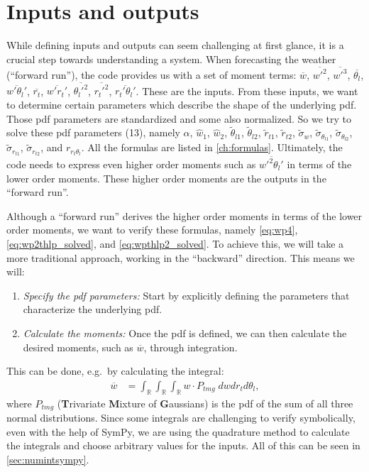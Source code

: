 \section{Inputs and outputs}\label{sec:inputsandoutputs}

While defining inputs and outputs can seem challenging at first glance,
it is a crucial step towards understanding a system.
When forecasting the weather (\enquote{forward run}),
the code provides us with a set of moment terms:
$\overline{w}$, $\overline{w'^2}$, $\overline{w'^3}$, $\overline{\theta_l}$, $\overline{w'\theta_l'}$,
$\overline{r_t}$, $\overline{w' r_t'}$, $\overline{\theta_l'^2}$, $\overline{r_t'^2}$, $\overline{r_t'\theta_l'}$.
These are the inputs.
From these inputs,
we want to determine certain parameters which describe the shape of the underlying \gls{pdf}.
Those \gls{pdf} parameters are standardized and some also normalized.
So we try to solve these \gls{pdf} parameters (13),
namely $\alpha$, $\widehat{w}_1$, $\widehat{w}_2$, $\tilde{\theta}_{l1}$, $\tilde{\theta}_{l2}$, $\tilde{r}_{t1}$,
$\tilde{r}_{t2}$, $\tilde{\sigma}_w$, $\tilde{\sigma}_{\theta_{l1}}$, $\tilde{\sigma}_{\theta_{l2}}$,
$\tilde{\sigma}_{r_{t1}}$, $\tilde{\sigma}_{r_{t2}}$, and $r_{r_t \theta_l}$.
All the formulas are listed in \cref{ch:formulas}.
Ultimately, the code needs to express even higher order moments such as $\overline{w'^2 \theta_l'}$
in terms of the lower order moments.
These higher order moments are the outputs in the \enquote{forward run}.

Although a \enquote{forward run} derives the higher order moments in terms of the lower order moments,
we want to verify these formulas,
namely \cref{eq:wp4}, \cref{eq:wp2thlp_solved}, and \cref{eq:wpthlp2_solved}.
To achieve this, we will take a more traditional approach, working in the \enquote{backward} direction.
This means we will:
\begin{enumerate}
    \item \emph{Specify the \gls{pdf} parameters:}
    Start by explicitly defining the parameters that characterize the underlying \gls{pdf}.
    \item \emph{Calculate the moments:}
    Once the \gls{pdf} is defined, we can then calculate the desired moments,
    such as $\overline{w}$, through integration.
\end{enumerate}
This can be done, e.g.\ by calculating the integral:
\begin{align}
    \overline{w}
    &= \int_{\mathbb{R}} \int_{\mathbb{R}} \int_{\mathbb{R}} w \cdot P_{tmg} \; dw dr_t d\theta_l,
\end{align}
where $P_{tmg}$ (\textbf{T}rivariate \textbf{M}ixture of \textbf{G}aussians)
is the \gls{pdf} of the sum of all three normal distributions.
Since some integrals are challenging to verify symbolically,
even with the help of SymPy,
we are using the quadrature method to calculate the integrals
and choose arbitrary values for the inputs.
All of this can be seen in \cref{sec:numintsympy}.
